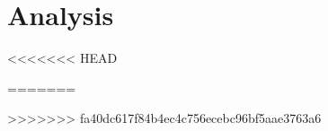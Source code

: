 \chapter{Analysis}





%
<<<<<<< HEAD


=======


>>>>>>> fa40dc617f84b4ec4c756ecebc96bf5aae3763a6




